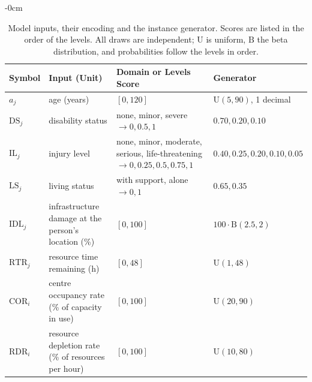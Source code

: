 \documentclass[systems,article,accept,moreauthors,pdftex]{Definitions/mdpi}
\begin{document}
\begin{table}[H]

\caption{Model inputs, their encoding and the instance generator. Scores are listed in the
order of the levels. All draws are independent; $\mathrm{U}$ is uniform, $\mathrm{B}$ the beta
distribution, and probabilities follow the levels in order.\label{tab:inputs}}
\small

\begin{adjustwidth}{-\extralength}{0cm}
\begin{minipage}{\fulllength}
\begin{tabularx}{\textwidth}{lLLL}
\toprule
\textbf{Symbol} & \textbf{Input (Unit)} & \textbf{Domain or Levels \boldmath{$\to$} Score} & \textbf{Generator}\\
\midrule
$a_j$ & age (years) & $[0,120]$ & $\mathrm{U}(5,90)$, 1 decimal\\
$\mathrm{DS}_j$ & disability status & none, minor, severe $\to 0, 0.5, 1$ & $0.70, 0.20, 0.10$\\
$\mathrm{IL}_j$ & injury level & none, minor, moderate, serious, life-threatening $\to 0, 0.25, 0.5, 0.75, 1$ & $0.40, 0.25, 0.20, 0.10, 0.05$\\
$\mathrm{LS}_j$ & living status & with support, alone $\to 0, 1$ & $0.65, 0.35$\\
$\mathrm{IDL}_j$ & infrastructure damage at the person's location (\%) & $[0,100]$ & $100\cdot\mathrm{B}(2.5,2)$\\
$\mathrm{RTR}_j$ & resource time remaining (h) & $[0,48]$ & $\mathrm{U}(1,48)$\\
$\mathrm{COR}_i$ & centre occupancy rate (\% of capacity in use) & $[0,100]$ & $\mathrm{U}(20,90)$\\
$\mathrm{RDR}_i$ & resource depletion rate (\% of resources per hour) & $[0,100]$ & $\mathrm{U}(10,80)$\\

\bottomrule
\end{tabularx}
\end{minipage}
\end{adjustwidth}
\end{table}
\end{document}
